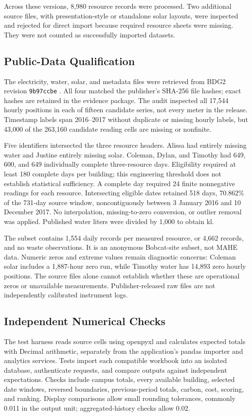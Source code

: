\documentclass[conference]{IEEEtran}
\begin{document}
Across these versions, 8,980 resource records were processed. Two additional source files, with presentation-style or standalone solar layouts, were inspected and rejected for direct import because required resource sheets were missing. They were not counted as successfully imported datasets.

\subsection{Public-Data Qualification}
The electricity, water, solar, and metadata files were retrieved from BDG2 revision \texttt{9b97ccbe} \cite{bdgsource}. All four matched the publisher's SHA-256 file hashes; exact hashes are retained in the evidence package. The audit inspected all 17,544 hourly positions in each of fifteen candidate series, not every meter in the release. Timestamp labels span 2016--2017 without duplicate or missing hourly labels, but 43,000 of the 263,160 candidate reading cells are missing or nonfinite.

Five identifiers intersected the three resource headers. Alissa had entirely missing water and Justine entirely missing solar. Coleman, Dylan, and Timothy had 649, 600, and 649 individually complete three-resource days. Eligibility required at least 180 complete days per building; this engineering threshold does not establish statistical sufficiency. A complete day required 24 finite nonnegative readings for each resource. Intersecting eligible dates retained 518 days, 70.862\% of the 731-day source window, noncontiguously between 3 January 2016 and 10 December 2017. No interpolation, missing-to-zero conversion, or outlier removal was applied. Published water liters were divided by 1,000 to obtain kl.

The subset contains 1,554 daily records per measured resource, or 4,662 records, and no waste observations. It is an anonymous Bobcat-site subset, not MAHE data. Numeric zeros and extreme values remain diagnostic concerns: Coleman solar includes a 1,887-hour zero run, while Timothy water has 14,893 zero hourly positions. The source files alone cannot establish whether these are operational zeros or unavailable measurements. Publisher-released raw files are not independently calibrated instrument logs.

\subsection{Independent Numerical Checks}
The test harness reads source cells using openpyxl and calculates expected totals with Decimal arithmetic, separately from the application's pandas importer and analytics services. Tests import each compatible workbook into an isolated database, authenticate requests, and compare outputs against independent expectations. Checks include campus totals, every available building, selected date windows, reversed boundaries, previous-period totals, carbon, cost, scoring, and ranking. Display comparisons allow small rounding tolerances, commonly 0.011 in the output unit; aggregated-history checks allow 0.02.
\end{document}
